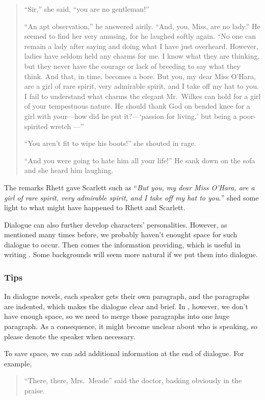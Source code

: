 \begin{quotation}
{\sffamily
``Sir,'' she said, ``you are no gentleman!''

``An apt observation,'' he answered airily. ``And, you, Miss, are no lady.'' He
seemed to find her very amusing, for he laughed softly again. ``No one can remain
a lady after saying and doing what I have just overheard. However, ladies have
seldom held any charms for me. I know what they are thinking, but they never
have the courage or lack of breeding to say what they think. And that, in time,
becomes a bore. But you, my dear Miss O'Hara, are a girl of rare spirit, very 
admirable spirit, and I take off my hat to you. I fail to understand what charms 
the elegant Mr.~Wilkes can hold for a girl of your tempestuous nature. He should 
thank God on bended knee for a girl with your---how did he put it?---`passion for 
living,' but being a poor-spirited wretch ---''

``You aren't fit to wipe his boots!'' she shouted in rage.

``And you were going to hate him all your life!'' He sank down on the sofa and
she heard him laughing.
}
\end{quotation}

The remarks Rhett gave Scarlett such as  ``\emph{But you, my dear Miss O'Hara, are 
a girl of rare spirit, very admirable spirit, and I take off my hat to you.}'' 
shed some light to what might have happened to Rhett and Scarlett.

Dialogue can also further develop characters' personalities. However, as mentioned 
many times before, we probably haven't enought space for such dialogue to occur. 
Then comes the information providing, which is useful in writing \DHXX . Some 
backgrounds will seem more natural if we put them into dialogue.

\subsubsection{Tips}

In dialogue novels, each speaker gets their own paragraph, and the paragraphs are 
indented, which makes the dialogue clear and brief. In \DHXX , however, we don't 
have enough space, so we need to merge those paragraphs into one huge paragraph. 
As a consequence, it might become unclear about who is speaking, so please denote
the speaker when necessary.

To save space, we can add additional information at the end of dialogue. For 
example, 
\begin{quote}
``There, there, Mrs.~Meade'' said the doctor, basking obviously in the praise.
\end{quote}

